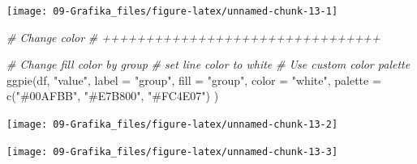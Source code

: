 \documentclass[
]{book}
\newenvironment{Shaded}{\begin{snugshade}}{\end{snugshade}}
\newcommand{\AttributeTok}[1]{\textcolor[rgb]{0.77,0.63,0.00}{#1}}
\newcommand{\CommentTok}[1]{\textcolor[rgb]{0.56,0.35,0.01}{\textit{#1}}}
\newcommand{\FunctionTok}[1]{\textcolor[rgb]{0.00,0.00,0.00}{#1}}
\newcommand{\NormalTok}[1]{#1}
\newcommand{\OtherTok}[1]{\textcolor[rgb]{0.56,0.35,0.01}{#1}}
\newcommand{\SpecialCharTok}[1]{\textcolor[rgb]{0.00,0.00,0.00}{#1}}
\newcommand{\StringTok}[1]{\textcolor[rgb]{0.31,0.60,0.02}{#1}}
\begin{document}
\begin{center}\texttt{[image: 09-Grafika\_files/figure-latex/unnamed-chunk-13-1]} \end{center}

\begin{Shaded}
\begin{Highlighting}[]


\CommentTok{\# Change color}
\CommentTok{\# ++++++++++++++++++++++++++++++++}

\CommentTok{\# Change fill color by group}
\CommentTok{\# set line color to white}
\CommentTok{\# Use custom color palette}
 \FunctionTok{ggpie}\NormalTok{(df, }\StringTok{"value"}\NormalTok{, }\AttributeTok{label =} \StringTok{"group"}\NormalTok{,}
      \AttributeTok{fill =} \StringTok{"group"}\NormalTok{, }\AttributeTok{color =} \StringTok{"white"}\NormalTok{,}
       \AttributeTok{palette =} \FunctionTok{c}\NormalTok{(}\StringTok{"\#00AFBB"}\NormalTok{, }\StringTok{"\#E7B800"}\NormalTok{, }\StringTok{"\#FC4E07"}\NormalTok{) )}
\end{Highlighting}
\end{Shaded}

\begin{center}\texttt{[image: 09-Grafika\_files/figure-latex/unnamed-chunk-13-2]} \end{center}

\begin{Shaded}
\end{Shaded}

\begin{center}\texttt{[image: 09-Grafika\_files/figure-latex/unnamed-chunk-13-3]} \end{center}
\end{document}
